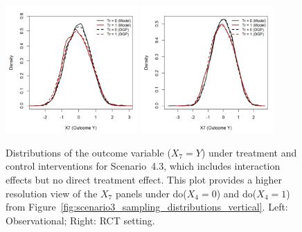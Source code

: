 \begin{figure}[htbp]
\centering
\includegraphics[width=0.45\textwidth]{img/results/observ_scenario3_X7_treatment_densities.png}
\includegraphics[width=0.45\textwidth]{img/results/rct_scenario3_X7_treatment_densities.png}
\caption{Distributions of the outcome variable ($X_7=Y$) under treatment and control interventions for Scenario~4.3, which includes interaction effects but no direct treatment effect. This plot provides a higher resolution view of the $X_7$ panels under do($X_4 = 0$) and do($X_4 = 1$) from Figure~\ref{fig:scenario3_sampling_distributions_vertical}. Left: Observational; Right: RCT setting.}
\label{fig:scenario3_outcome_distributions}
\end{figure}




